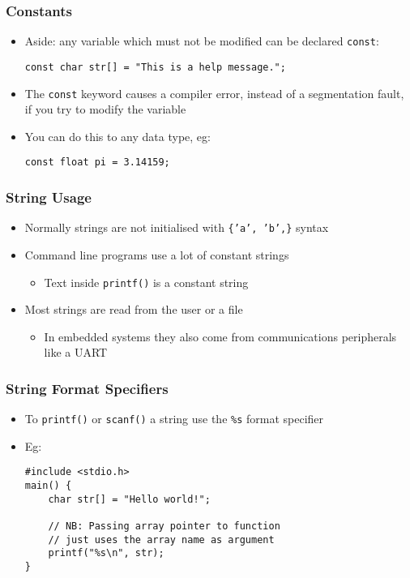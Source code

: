 \documentclass[14pt]{beamer}
\begin{document}
\begin{frame}[fragile]
\frametitle{Constants}
\begin{itemize}
\item Aside: any variable which must not be modified can be declared \texttt{const}:
\begin{lstlisting}[style=CStyle]
const char str[] = "This is a help message.";
\end{lstlisting}
\item The \texttt{const} keyword causes a compiler error, instead of a segmentation fault, if you try to modify the variable
\item You can do this to any data type, eg:
\begin{lstlisting}[style=CStyle]
const float pi = 3.14159;
\end{lstlisting}
\end{itemize}
\end{frame}

\begin{frame}
\frametitle{String Usage}
\begin{itemize}
\item Normally strings are not initialised with \texttt{\{'a', 'b',\}} syntax
\item Command line programs use a lot of constant strings
	\begin{itemize}
		\item Text inside \texttt{printf()} is a constant string
	\end{itemize}
\item Most strings are read from the user or a file
	\begin{itemize}
		\item In embedded systems they also come from communications peripherals like a UART
	\end{itemize}
\end{itemize}
\end{frame}

\begin{frame}[fragile]
\frametitle{String Format Specifiers}
\begin{itemize}
\item To \texttt{printf()} or \texttt{scanf()} a string use the \texttt{\%s} format specifier
\item Eg:
\begin{lstlisting}[style=CStyle]
#include <stdio.h>
main() {
	char str[] = "Hello world!";
	
	// NB: Passing array pointer to function
	// just uses the array name as argument
	printf("%s\n", str);
}
\end{lstlisting}
\end{itemize}
\end{frame}
\end{document}
